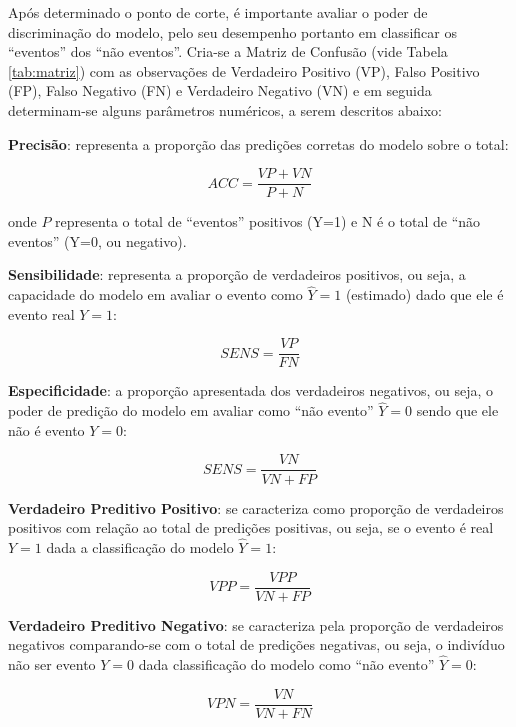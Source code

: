 \documentclass[12pt,brazil,oneside]{book}
\begin{document}
Após determinado o ponto de corte, é importante avaliar o poder de
discriminação do modelo, pelo seu desempenho portanto em classificar os
``eventos'' dos ``não eventos''. Cria-se a Matriz de Confusão (vide
Tabela \ref{tab:matriz}) com as observações de Verdadeiro Positivo (VP),
Falso Positivo (FP), Falso Negativo (FN) e Verdadeiro Negativo (VN) e em
seguida determinam-se alguns parâmetros numéricos, a serem descritos
abaixo:

\textbf{Precisão}: representa a proporção das predições corretas do
modelo sobre o total:

\[
ACC=\frac{VP+VN}{P+N}
\]

onde \(P\) representa o total de ``eventos'' positivos (Y=1) e N é o
total de ``não eventos'' (Y=0, ou negativo).

\textbf{Sensibilidade}: representa a proporção de verdadeiros positivos,
ou seja, a capacidade do modelo em avaliar o evento como \(\hat Y=1\)
(estimado) dado que ele é evento real \(Y=1\):

\[
SENS=\frac{VP}{FN}
\]

\textbf{Especificidade}: a proporção apresentada dos verdadeiros
negativos, ou seja, o poder de predição do modelo em avaliar como ``não
evento'' \(\hat Y=0\) sendo que ele não é evento \(Y=0\):

\[
SENS=\frac{VN}{VN+FP}
\]

\textbf{Verdadeiro Preditivo Positivo}: se caracteriza como proporção de
verdadeiros positivos com relação ao total de predições positivas, ou
seja, se o evento é real \(Y=1\) dada a classificação do modelo
\(\hat Y=1\):

\[
VPP=\frac{VPP}{VN+FP}
\]

\textbf{Verdadeiro Preditivo Negativo}: se caracteriza pela proporção de
verdadeiros negativos comparando-se com o total de predições negativas,
ou seja, o indivíduo não ser evento \(Y=0\) dada classificação do modelo
como ``não evento'' \(\hat Y=0\):

\[
VPN=\frac{VN}{VN+FN}
\]
\end{document}
